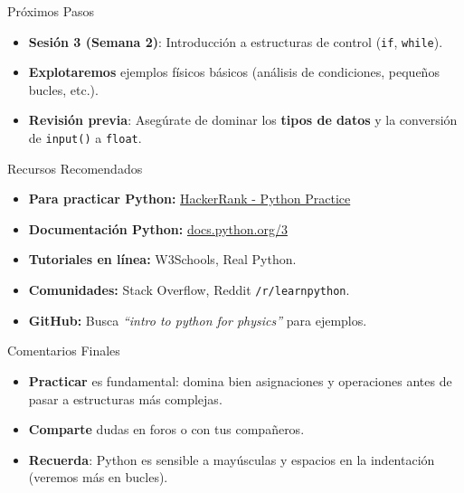 \documentclass[10pt]{beamer}
\begin{document}
\begin{frame}{Próximos Pasos}
  \begin{itemize}
    \item \textbf{Sesión 3 (Semana 2)}: Introducción a estructuras de control (\texttt{if}, \texttt{while}).
    \item \textbf{Explotaremos} ejemplos físicos básicos (análisis de condiciones, pequeños bucles, etc.).
    \item \textbf{Revisión previa}: Asegúrate de dominar los \textbf{tipos de datos} y la conversión de \texttt{input()} a \texttt{float}.
  \end{itemize}
\end{frame}

\begin{frame}{Recursos Recomendados}
  \begin{itemize}
    \item \textbf{Para practicar Python:} \href{https://www.hackerrank.com/domains/python?filters\%5Bdifficulty\%5D\%5B\%5D=easy}{HackerRank - Python Practice}
    \item \textbf{Documentación Python:} \href{https://docs.python.org/3/}{docs.python.org/3}
    \item \textbf{Tutoriales en línea:} W3Schools, Real Python.
    \item \textbf{Comunidades:} Stack Overflow, Reddit \texttt{/r/learnpython}.
    \item \textbf{GitHub:} Busca \emph{“intro to python for physics”} para ejemplos.
  \end{itemize}
\end{frame}

\begin{frame}{Comentarios Finales}
  \begin{itemize}
    \item \textbf{Practicar} es fundamental: domina bien asignaciones y operaciones antes de pasar a estructuras más complejas.
    \item \textbf{Comparte} dudas en foros o con tus compañeros.
    \item \textbf{Recuerda}: Python es sensible a mayúsculas y espacios en la indentación (veremos más en bucles).
  \end{itemize}
\end{frame}
\end{document}
